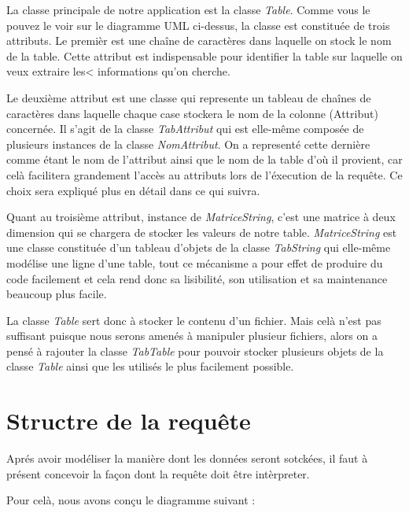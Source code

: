 \documentclass[oneside,13pt,a4paper]{report}
\begin{document}
La classe principale de notre application est la classe \textit{Table}.
Comme vous le pouvez le voir sur le diagramme UML ci-dessus,
la classe est constituée de trois attributs. Le premièr est une chaîne de caractères dans laquelle on stock le nom de la table.
Cette attribut est indispensable pour identifier la table sur laquelle on veux extraire les< informations qu’on cherche.


Le deuxième attribut est une classe qui represente un tableau de chaînes de caractères dans laquelle chaque case stockera le nom de la colonne (Attribut) concernée.
Il s'agit de la classe \textit{TabAttribut} qui est elle-même composée de plusieurs instances de la classe \textit{NomAttribut}.
On a representé cette dernière comme étant le nom de l'attribut ainsi que le nom de la table d'où il provient,
car celà facilitera grandement l'accès au attributs lors de l'éxecution de la requête. Ce choix sera expliqué plus en détail dans ce qui suivra.

Quant au troisième attribut, instance de \textit{MatriceString}, c’est une matrice à deux dimension qui se chargera de stocker les valeurs de notre table.
\textit{MatriceString} est une classe constituée d'un tableau d'objets de la classe \textit{TabString} qui elle-même modélise une ligne d'une table, tout ce mécanisme a pour effet de produire du code facilement et cela rend donc sa lisibilité, son utilisation et sa maintenance beaucoup plus facile.

La classe \textit{Table} sert donc à stocker le contenu d'un fichier. Mais celà n'est pas suffisant puisque nous serons amenés à manipuler plusieur fichiers, alors on a pensé à rajouter
la classe \textit{TabTable} pour pouvoir stocker plusieurs objets de la classe \textit{Table} ainsi que les utilisés le plus facilement possible.

\section{Structre de la requête}
\label{requete}
Aprés avoir modéliser la manière dont les données seront sotckées, il faut à présent concevoir la façon dont la requête doit être intèrpreter.

Pour celà, nous avons conçu le diagramme suivant :
\end{document}
